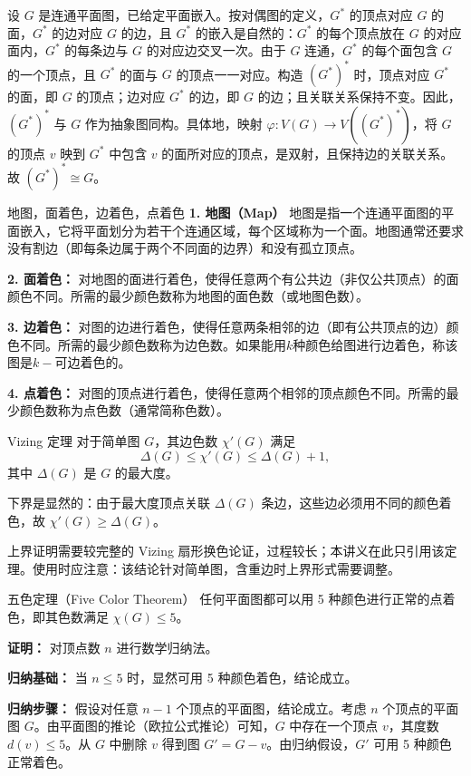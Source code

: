 \documentclass[lang=cn,11pt]{elegantbook}
\begin{document}
设 $G$ 是连通平面图，已给定平面嵌入。按对偶图的定义，$G^*$ 的顶点对应 $G$ 的面，$G^*$ 的边对应 $G$ 的边，且 $G^*$ 的嵌入是自然的：$G^*$ 的每个顶点放在 $G$ 的对应面内，$G^*$ 的每条边与 $G$ 的对应边交叉一次。由于 $G$ 连通，$G^*$ 的每个面包含 $G$ 的一个顶点，且 $G^*$ 的面与 $G$ 的顶点一一对应。构造 $(G^*)^*$ 时，顶点对应 $G^*$ 的面，即 $G$ 的顶点；边对应 $G^*$ 的边，即 $G$ 的边；且关联关系保持不变。因此，$(G^*)^*$ 与 $G$ 作为抽象图同构。具体地，映射 $\varphi: V(G) \to V((G^*)^*)$，将 $G$ 的顶点 $v$ 映到 $G^*$ 中包含 $v$ 的面所对应的顶点，是双射，且保持边的关联关系。故 $(G^*)^* \cong G$。
\begin{definition}{地图，面着色，边着色，点着色}
\textbf{1. 地图（Map）}
地图是指一个连通平面图的平面嵌入，它将平面划分为若干个连通区域，每个区域称为一个面。地图通常还要求没有割边（即每条边属于两个不同面的边界）和没有孤立顶点。

\textbf{2. 面着色：}
对地图的面进行着色，使得任意两个有公共边（非仅公共顶点）的面颜色不同。所需的最少颜色数称为地图的面色数（或地图色数）。

\textbf{3. 边着色：}
对图的边进行着色，使得任意两条相邻的边（即有公共顶点的边）颜色不同。所需的最少颜色数称为边色数。如果能用$k$种颜色给图进行边着色，称该图是$k-$可边着色的。

\textbf{4. 点着色：}
对图的顶点进行着色，使得任意两个相邻的顶点颜色不同。所需的最少颜色数称为点色数（通常简称色数）。
\end{definition}
\begin{theorem}{Vizing 定理}
    对于简单图 $G$，其边色数 $\chi'(G)$ 满足
    \[
    \Delta(G) \le \chi'(G) \le \Delta(G) + 1,
    \]
    其中 $\Delta(G)$ 是 $G$ 的最大度。
\end{theorem}
下界是显然的：由于最大度顶点关联 $\Delta(G)$ 条边，这些边必须用不同的颜色着色，故 $\chi'(G) \ge \Delta(G)$。

上界证明需要较完整的 Vizing 扇形换色论证，过程较长；本讲义在此只引用该定理。使用时应注意：该结论针对简单图，含重边时上界形式需要调整。

\begin{theorem}{五色定理（Five Color Theorem）}
    任何平面图都可以用 5 种颜色进行正常的点着色，即其色数满足 $\chi(G) \le 5$。
\end{theorem}
\textbf{证明：} 对顶点数 $n$ 进行数学归纳法。

    \textbf{归纳基础：} 当 $n \le 5$ 时，显然可用 5 种颜色着色，结论成立。

    \textbf{归纳步骤：} 假设对任意 $n-1$ 个顶点的平面图，结论成立。考虑 $n$ 个顶点的平面图 $G$。由平面图的推论（欧拉公式推论）可知，$G$ 中存在一个顶点 $v$，其度数 $d(v) \le 5$。从 $G$ 中删除 $v$ 得到图 $G' = G - v$。由归纳假设，$G'$ 可用 5 种颜色正常着色。
\end{document}
